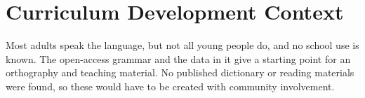 \documentclass[12pt]{article}
\begin{document}
\section{Curriculum Development Context}
Most adults speak the language, but not all young people do, and no school use is known. The open-access grammar and the data in it give a starting point for an orthography and teaching material. No published dictionary or reading materials were found, so these would have to be created with community involvement.
\end{document}
